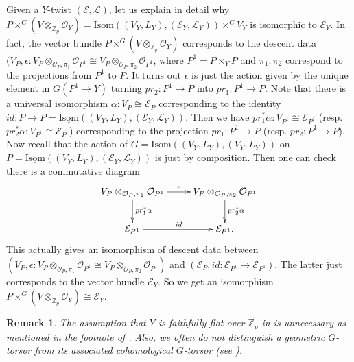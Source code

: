 \documentclass[10pt]{article}
\newtheorem{rmk}[thm]{Remark}
\numberwithin{equation}{section}
\newcommand{\bZ}{{\mathbb Z}}
\newcommand{\calE}{{\mathcal E}}
\newcommand{\calL}{{\mathcal L}}
\newcommand{\calO}{{\mathcal O}}
\newcommand{\Isom}{{\mathrm{Isom}}}         %
\begin{document}
Given a $Y$-twist $(\calE,\calL)$, let us explain in detail why $P\times^G (V\otimes_{\bZ_p}\calO_Y)=\underline\Isom((V_Y,L_Y),(\calE_Y,\calL_Y))\times^GV_Y$ is isomorphic to $\calE_Y$. In fact, the vector bundle $P\times^G (V\otimes_{\bZ_p}\calO_Y)$ corresponds to the descent data $(V_P, \epsilon: V_P\otimes_{\calO_P,\pi_1}\calO_{P^1}\cong V_P\otimes_{\calO_P,\pi_2}\calO_{P^1}$, where $P^1=P\times_YP$ and $\pi_1,\pi_2$ correspond to the projections from $P^1$ to $P$. It turns out $\epsilon$ is just the action given by the unique element in $G(P^1\to Y)$ turning $pr_2:P^1\to P$ into $pr_1: P^1\to P$. Note that there is a universal isomorphism $\alpha:V_P\cong \calE_P$ corresponding to the identity $id: P\to P=\underline\Isom((V_Y,L_Y),(\calE_Y,\calL_Y))$. Then we have $pr_1^*\alpha: V_{P^1}\cong \calE_{P^1}$ (resp. $pr_2^*\alpha: V_{P^1}\cong \calE_{P^1}$) corresponding to the projection $pr_1:P^1\to P$ (resp. $pr_2: P^1\to P$). Now recall that the action of $G=\underline\Isom((V_Y,L_Y),(V_Y,L_Y))$ on $P=\underline\Isom((V_Y,L_Y),(\calE_Y,\calL_Y))$ is just by composition. Then one can check there is a commutative diagram
\begin{equation*}
    \xymatrix{
    V_P\otimes_{\calO_P,\pi_1}\calO_{P^1}\ar[r]^{\epsilon}\ar[d]^{pr_1^*\alpha}& V_P\otimes_{\calO_P,\pi_2}\calO_{P^1}\ar[d]^{pr_2^*\alpha}\\
    \calE_{P^1}\ar[r]^{id}& \calE_{P^1}.
    }
\end{equation*}
This actually gives an isomorphism of descent data between $(V_P, \epsilon: V_P\otimes_{\calO_P,\pi_1}\calO_{P^1}\cong V_P\otimes_{\calO_P,\pi_2}\calO_{P^1})$ and $(\calE_P, id: \calE_{P^1}\to \calE_{P^1})$. The latter just corresponds to the vector bundle $\calE_Y$. So we get an isomorphism $P\times^G (V\otimes_{\bZ_p}\calO_Y)\cong \calE_Y$.

\begin{rmk}
    The assumption that $Y$ is faithfully flat over $\bZ_p$ in \cite[Theorem 1.2]{Bro13} is unnecessary as mentioned in the footnote of \cite[Theorem 19.5.1]{WS20}. Also, we often do not distinguish a geometric $G$-torsor from its associated cohomological $G$-torsor (see \cite[Theorem 19.5.1]{WS20}).
\end{rmk}
\end{document}
